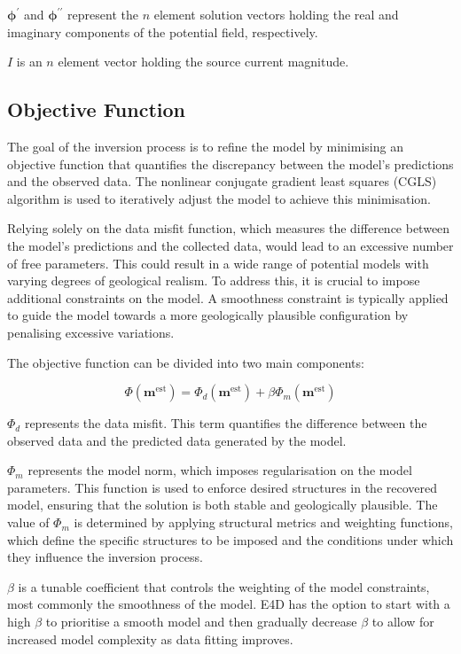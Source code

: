 \documentclass[a4paper,12pt]{article}
\begin{document}
$\boldsymbol {\phi}^{\prime}$ and $\boldsymbol {\phi}^{\prime\prime}$ represent the $n$ element solution vectors holding the real and imaginary components of the potential field, respectively.

$I$ is an $n$ element vector holding the source current magnitude.

\subsection{Objective Function}

The goal of the inversion process is to refine the model by minimising an
objective function that quantifies the discrepancy between the model's
predictions and the observed data. The nonlinear conjugate gradient least
squares (CGLS) algorithm is used to iteratively adjust the model to achieve
this minimisation.

Relying solely on the data misfit function, which measures the difference
between the model's predictions and the collected data, would lead to an
excessive number of free parameters. This could result in a wide range of
potential models with varying degrees of geological realism. To address this,
it is crucial to impose additional constraints on the model. A smoothness
constraint is typically applied to guide the model towards a more geologically
plausible configuration by penalising excessive variations.

The objective function can be divided into two main components:

\begin{equation}
    \Phi (\mathbf{m}^{\text{est}}) = \Phi_d (\mathbf{m}^{\text{est}}) + \beta \Phi_m (\mathbf{m}^{\text{est}})
\end{equation}

$\Phi_d$ represents the data misfit. This term quantifies the difference between the observed data and the predicted data generated by the model.

\(\Phi_m\) represents the model norm, which imposes regularisation on the model parameters. This function is used to enforce desired structures in the recovered model, ensuring that the solution is both stable and geologically plausible. The value of \(\Phi_m\) is determined by applying structural metrics and weighting functions, which define the specific structures to be imposed and the conditions under which they influence the inversion process.

$\beta$ is a tunable coefficient that controls the weighting of the model constraints, most commonly the smoothness of the model. E4D has the option to start with a high $\beta$ to prioritise a smooth model and then gradually decrease $\beta$ to allow for increased model complexity as data fitting improves.
\end{document}
